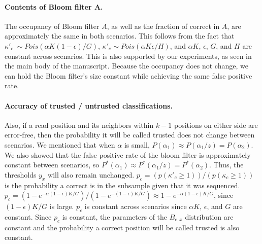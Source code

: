 \documentclass[10pt]{article}
\begin{document}
\paragraph{Contents of Bloom filter A.} The occupancy of Bloom filter $A$, as well as the fraction of correct \kmers in $A$, are approximately the same in both scenarios.  This follows from the fact that $\kappa'_c ~ \sim Pois(\alpha K (1 - \epsilon) / G)$, $\kappa'_e \sim Pois(\alpha K \epsilon / H)$, and $\alpha K$, $\epsilon$, $G$, and $H$ are constant across scenarios.  This is also supported by our experiments, as seen in the main body of the manuscript.  Because the occupancy does not change, we can hold the Bloom filter's size constant while achieving the same false positive rate.


\paragraph{Accuracy of trusted / untrusted classifications.}
Also, if a read position and its neighbors within $k-1$ positions on either side are error-free, then the probability it will be called trusted does not change between scenarios.  We mentioned that when $\alpha$ is small, $P(\alpha_1) \approx P(\alpha_1/z) = P(\alpha_2)$.  We also showed that the false positive rate of the bloom filter is approximately constant between scenarios, so $P^*(\alpha_1) \approx P^*(\alpha_1/z) = P^*(\alpha_2)$.  Thus, the thresholds $y_x$ will also remain unchanged.
$p_c=(p(\kappa'_c\ge 1))/(p(\kappa_c\ge 1))$ is the probability a correct \kmer is in the subsample given that it was sequenced.
$p_c=(1-e^{-\alpha(1-\epsilon) K/G})/(1-e^{-(1-\epsilon) K/G})\approx 1-e^{-\alpha(1-\epsilon)K/G}$, since $(1-\epsilon)K/G$ is large.
$p_c$ is constant across scenarios since $\alpha K$, $\epsilon$, and $G$ are constant.
Since $p_c$ is constant, the parameters of the $B_{e,x}$ distribution are constant and the probability a correct position will be called trusted is also constant.
\end{document}
